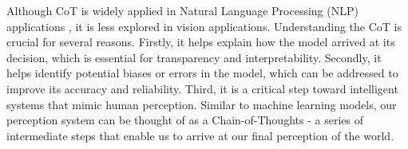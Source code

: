 Although CoT is widely applied in Natural Language Processing (NLP) applications \citep{wei2022chain, chowdhery2022palm, lyu2023faithful, wang2022self, zhang2023multimodal, madaan2022text}, it is less explored in vision applications.
Understanding the CoT is crucial for several reasons. Firstly, it helps explain how the model arrived at its decision, which is essential for transparency and interpretability. Secondly, it helps identify potential biases or errors in the model, which can be addressed to improve its accuracy and reliability.
Third, it is a critical step toward intelligent systems that mimic human perception.
Similar to machine learning models, our perception system can be thought of as a Chain-of-Thoughts \citep{mcvay2009conducting, chen2017unified} - a series of intermediate steps that enable us to arrive at our final perception of the world.

